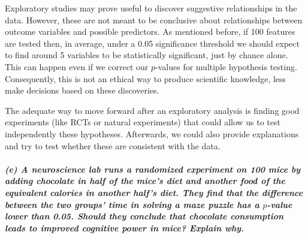 \documentclass[11pt, english]{article}
\begin{document}
    Exploratory studies may prove useful to discover suggestive
relationships in the data. However, these are not meant to be conclusive
about relationships between outcome variables and possible predictors.
As mentioned before, if 100 features are tested then, in average, under
a 0.05 significance threshold we should expect to find around 5
variables to be statistically significant, just by chance alone. This
can happen even if we correct our \(p\)-values for multiple hypothesis
testing. Consequently, this is not an ethical way to produce scientific
knowledge, less make decisions based on these discoveries.

The adequate way to move forward after an exploratory analysis is
finding good experiments (like RCTs or natural experiments) that could
allow us to test independently these hypotheses. Afterwards, we could
also provide explanations and try to test whether these are consistent
with the data.

    \hypertarget{e-a-neuroscience-lab-runs-a-randomized-experiment-on-100-mice-by-adding-chocolate-in-half-of-the-mices-diet-and-another-food-of-the-equivalent-calories-in-another-halfs-diet.-they-find-that-the-difference-between-the-two-groups-time-in-solving-a-maze-puzzle-has-a-p-value-lower-than-0.05.-should-they-conclude-that-chocolate-consumption-leads-to-improved-cognitive-power-in-mice-explain-why.}{%
\subparagraph{\texorpdfstring{(e) A neuroscience lab runs a randomized
experiment on 100 mice by adding chocolate in half of the mice's diet
and another food of the equivalent calories in another half's diet. They
find that the difference between the two groups' time in solving a maze
puzzle has a \(p\)-value lower than 0.05. Should they conclude that
chocolate consumption leads to improved cognitive power in mice? Explain
why.\\[2ex]}{(e) A neuroscience lab runs a randomized experiment on 100 mice by adding chocolate in half of the mice's diet and another food of the equivalent calories in another half's diet. They find that the difference between the two groups' time in solving a maze puzzle has a p-value lower than 0.05. Should they conclude that chocolate consumption leads to improved cognitive power in mice? Explain why.}}\label{e-a-neuroscience-lab-runs-a-randomized-experiment-on-100-mice-by-adding-chocolate-in-half-of-the-mices-diet-and-another-food-of-the-equivalent-calories-in-another-halfs-diet.-they-find-that-the-difference-between-the-two-groups-time-in-solving-a-maze-puzzle-has-a-p-value-lower-than-0.05.-should-they-conclude-that-chocolate-consumption-leads-to-improved-cognitive-power-in-mice-explain-why.}}
\end{document}
